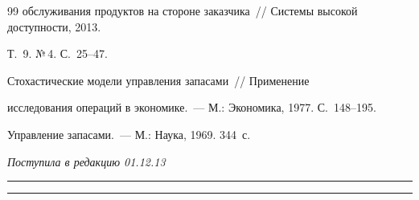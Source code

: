 {{\begin{thebibliography}{99}
обслуживания продуктов на стороне заказчика~/\!\!/ Сис\-те\-мы высокой доступности, 2013.

Т.~9. №\,4. С.~25--47.


 Стохастические модели управления запасами~/\!\!/ Применение

исследования операций в экономике.~--- М.: Экономика, 1977. С.~148--195.


 Управление запасами.~--- М.: Наука, 1969. 344~с.



\end{thebibliography}

}

}



\vspace*{-6pt}



\hfill{\small\textit{Поступила в редакцию 01.12.13}}





\vspace*{12pt}



\hrule



\vspace*{2pt}



\hrule



\def\tit{METHODS AND TOOLS FOR~OPTIMAL PLANNING OF~PROCESS

PARAMETERS IN~AFTERSALE SERVICE SYSTEMS OF~HIGH

TECHNOLOGY PRODUCTS}



\def\titkol{Methods and tools for~optimal planning of~process

parameters in~aftersale service systems} %



\def\aut{I.\,N.~Sinitsyn$^1$, A.\,S.~Shalamov$^1$, I.\,V.~Sergeev$^1$,

E.\,R.~Korepanov$^1$, V.\,V.~Belousov$^1$, T.\,S.~Gumnikova$^2$,

V.\,S.~Shorgin$^1$, and~E.\,S.~Agafonov$^1$}

\def\autkol{I.\,N.~Sinitsyn, A.\,S.~Shalamov, I.\,V.~Sergeev,  et al.}





